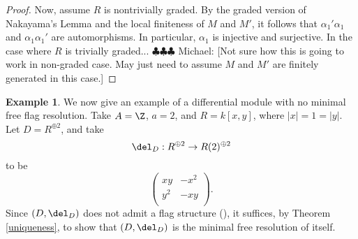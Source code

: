 \documentclass[12pt]{amsart}
\theoremstyle{definition}
\newtheorem{example}[lemma]{Example}
\theoremstyle{remark}
\newcommand{\michael}[1]{{\color{red} \sf $\clubsuit\clubsuit\clubsuit$ Michael: [#1]}}
\def\a{\alpha}
\begin{document}
\begin{proof}
Now, assume $R$ is nontrivially graded. By the graded version of Nakayama's Lemma and the local finiteness of $M$ and $M'$, it follows that $\a_1'\a_1$ and $\a_1\a_1'$ are automorphisms. In particular, $\a_1$ is injective and surjective. In the case where $R$ is trivially graded... \michael{Not sure how this is going to work in non-graded case. May just need to assume $M$ and $M'$ are finitely generated in this case.}
\end{proof}

\begin{example}
\label{DNE}
We now give an example of a differential module with no minimal free flag resolution. Take $A = \Z$, $a = 2$, and $R = k[x, y]$, where $|x| = 1 = |y|$. Let $D = R^{\oplus 2}$, and take
$$
\del_D : R^{\oplus 2} \to R(2)^{\oplus 2}
$$
to be
$$
\begin{pmatrix}
xy & -x^2 \\
y^2 & -xy\\
\end{pmatrix}.
$$
Since $(D, \del_D)$ does not admit a flag structure (\cite{ABI}), it suffices, by Theorem \ref{uniqueness}, to show that $(D, \del_D)$ is the minimal free resolution of itself. 


\end{example}
\end{document}
